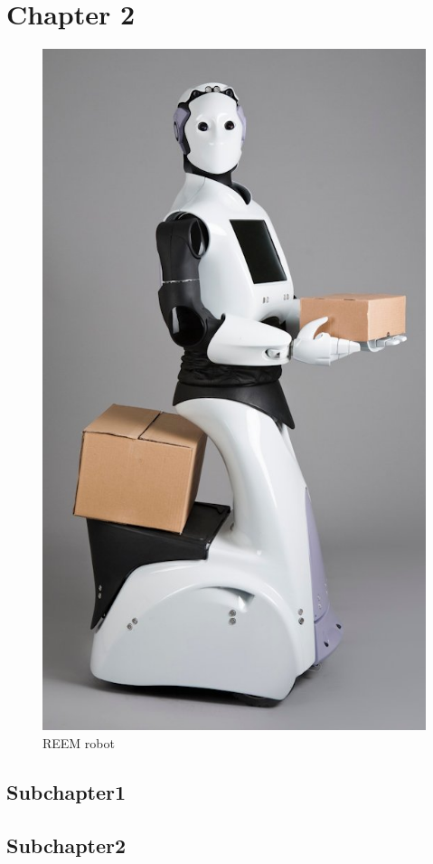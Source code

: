 \section{Chapter 2}
\label{sec:chap2}

\begin{figure}[ht]
\centering
\includegraphics[width=0.5\linewidth]{image/reem.jpg}
\caption{REEM robot}
\label{fig:reem}
\end{figure}

\subsection{Subchapter1}
\label{sec:chap2sec1}

\subsection{Subchapter2}
\label{sec:chap2sec2}

